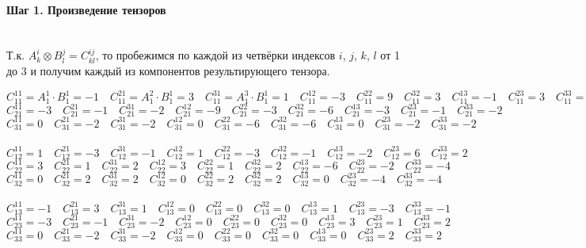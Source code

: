 \documentclass{article}
\begin{document}
\paragraph*{Шаг 1. Произведение тензоров} \, \\
Т.к. $A^i_k \otimes B^j_l = C^{ij}_{kl}$, то пробежимся по каждой из четвёрки индексов $i$, $j$, $k$, $l$ от 1 до 3 и получим каждый из компонентов результирующего тензора.

\begin{center}
$C^{11}_{11} = A^1_1 \cdot B^1_1 = -1 \quad C^{21}_{11} = A^2_1 \cdot B^1_1 = 3 \quad C^{31}_{11} = A^3_1 \cdot B^1_1 = 1 \quad C^{12}_{11} = -3 \quad C^{22}_{11} = 9 \quad C^{32}_{11} = 3 \quad C^{13}_{11} = -1 \quad C^{23}_{11} = 3 \quad C^{33}_{11} = 1$ \\
$C^{11}_{21} = -3 \quad C^{21}_{21} = -1 \quad C^{31}_{21} = -2 \quad C^{12}_{21} = -9 \quad C^{22}_{21} = -3 \quad C^{32}_{21} = -6 \quad C^{13}_{21} = -3 \quad C^{23}_{21} = -1 \quad C^{33}_{21} = -2$ \\
$C^{11}_{31} = 0 \quad C^{21}_{31} = -2 \quad C^{31}_{31} = -2 \quad C^{12}_{31} = 0 \quad C^{22}_{31} = -6 \quad C^{32}_{31} = -6 \quad C^{13}_{31} = 0 \quad C^{23}_{31} = -2 \quad C^{33}_{31} = -2$ \\ \, \\

$C^{11}_{12} = 1 \quad C^{21}_{12} = -3 \quad C^{31}_{12} = -1 \quad C^{12}_{12} = 1 \quad C^{22}_{12} = -3 \quad C^{32}_{12} = -1 \quad C^{13}_{12} = -2 \quad C^{23}_{12} = 6 \quad C^{33}_{12} = 2$ \\
$C^{11}_{22} = 3 \quad C^{21}_{22} = 1 \quad C^{31}_{22} = 2 \quad C^{12}_{22} = 3 \quad C^{22}_{22} = 1 \quad C^{32}_{22} = 2 \quad C^{13}_{22} = -6 \quad C^{23}_{22} = -2 \quad C^{33}_{22} = -4$ \\
$C^{11}_{32} = 0 \quad C^{21}_{32} = 2 \quad C^{31}_{32} = 2 \quad C^{12}_{32} = 0 \quad C^{22}_{32} = 2 \quad C^{32}_{32} = 2 \quad C^{13}_{32} = 0 \quad C^{23}_{32} = -4 \quad C^{33}_{32} = -4$ \\ \, \\

$C^{11}_{13} = -1 \quad C^{21}_{13} = 3 \quad C^{31}_{13} = 1 \quad C^{12}_{13} = 0 \quad C^{22}_{13} = 0 \quad C^{32}_{13} = 0 \quad C^{13}_{13} = 1 \quad C^{23}_{13} = -3 \quad C^{33}_{13} = -1$ \\
$C^{11}_{23} = -3 \quad C^{21}_{23} = -1 \quad C^{31}_{23} = -2 \quad C^{12}_{23} = 0 \quad C^{22}_{23} = 0 \quad C^{32}_{23} = 0 \quad C^{13}_{23} = 3 \quad C^{23}_{23} = 1 \quad C^{33}_{23} = 2$ \\
$C^{11}_{33} = 0 \quad C^{21}_{33} = -2 \quad C^{31}_{33} = -2 \quad C^{12}_{33} = 0 \quad C^{22}_{33} = 0 \quad C^{32}_{33} = 0 \quad C^{13}_{33} = 0 \quad C^{23}_{33} = 2 \quad C^{33}_{33} = 2$ \\ \, \\


\end{center}
\end{document}

